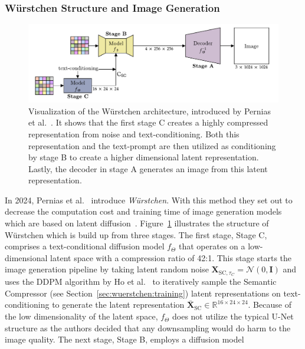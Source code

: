 \subsubsection{W\"urstchen Structure and Image Generation}
\begin{figure}[t]
    \includegraphics[width=\textwidth]{assets/wuerstchen_arch.pdf}
    \caption{Visualization of the W\"urstchen architecture, introduced by
        Pernias et al.~\cite{pernias2024wrstchen}. It shows that the first stage C
        creates a highly compressed representation from noise and text-conditioning.
        Both this representation and the text-prompt are then utilized as conditioning by stage B
        to create a higher dimensional latent representation. Lastly, the decoder
        in stage A generates an image from this latent representation.}
    \label{fig:wuerstchen:arch}
\end{figure}
In 2024, Pernias et al.~\cite{pernias2024wrstchen} introduce \emph{W\"urstchen}.
With this method they set out to decrease the computation cost and training
time of image generation models which are based on latent diffusion~\cite{rombach2022stablediffusion}.
Figure~\ref{fig:wuerstchen:arch} illustrates the structure of W\"urstchen which
is build up from three stages. The first stage, Stage C, comprises a
text-conditional diffusion model $f_\Theta$ that operates on a low-dimensional
latent space with a compression ratio of 42:1. This stage starts the image
generation pipeline by taking latent random noise
$\boldsymbol{X}_{\text{SC}, \tau_C} = \mathcal{N}(0, \boldsymbol{\text{I}})$ and
uses the DDPM algorithm by Ho et al.~\cite{DBLP:conf/nips/HoJA20} to iteratively
sample the Semantic Compressor (see Section~\ref{sec:wuerstchen:training})
latent representations on text-conditioning to generate the latent representation
$\bar{\boldsymbol{X}}_{\text{SC}}\in\mathbb{R}^{16\times24\times24}$. Because of
the low dimensionality of the latent space, $f_\Theta$ does not utilize the
typical U-Net structure as the authors decided that any downsampling would do
harm to the image quality. The next stage, Stage B, employs a diffusion model
